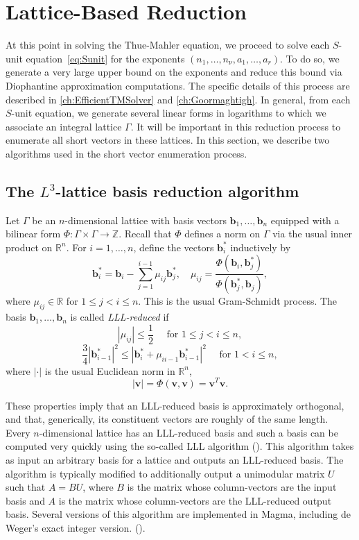 \section{Lattice-Based Reduction}
\label{sec:LatticeReduction}

At this point in solving the Thue-Mahler equation, we proceed to solve each $S$-unit equation~\eqref{eq:Sunit} for the exponents $(n_1, \dots, n_{\nu}, a_1, \dots, a_r)$. To do so, we generate a very large upper bound on the exponents and reduce this bound via Diophantine approximation computations. The specific details of this process are described in \autoref{ch:EfficientTMSolver} and \autoref{ch:Goormaghtigh}. In general, from each $S$-unit equation, we generate several linear forms in logarithms to which we associate an integral lattice $\Gamma$. It will be important in this reduction process to enumerate all short vectors in these lattices. In this section, we describe two algorithms used in the short vector enumeration process. 


\subsection{The $L^3$-lattice basis reduction algorithm}
\label{subsec:LLL}

Let $\Gamma$ be an $n$-dimensional lattice with basis vectors $\mathbf{b}_1, \dots, \mathbf{b}_n$ equipped with a bilinear form $\Phi: \Gamma \times \Gamma \to \mathbb{Z}$. Recall that $\Phi$ defines a norm on $\Gamma$ via the usual inner product on $\mathbb{R}^n$. For $i = 1, \dots, n$, define the vectors $\mathbf{b}_i^*$ inductively by
\[\mathbf{b}_i^* = \mathbf{b}_i - \sum_{j=1}^{i-1}\mu_{ij}\mathbf{b}_j^*, \quad \mu_{ij} = \frac{\Phi(\mathbf{b}_i,\mathbf{b}_j^*)}{\Phi(\mathbf{b}_j^*,\mathbf{b}_j)},\]
where $\mu_{ij} \in \mathbb{R}$ for $1\leq j < i \leq n$. This is the usual Gram-Schmidt process. The basis $\mathbf{b}_1,\dots, \mathbf{b}_n$ is called \textit{LLL-reduced} if
\[|\mu_{ij}| \leq \frac{1}{2} \quad \text{ for } 1\leq j < i \leq n, \]
\[\frac{3}{4}|\mathbf{b}_{i-1}^*|^2 \leq |\mathbf{b}_i^* + \mu_{ii-1}\mathbf{b}_{i-1}^*|^2 \quad \text{ for } 1 <i \leq n,\]
where $| \cdot |$ is the usual Euclidean norm in $\mathbb{R}^n$, 
\[|\mathbf{v}| = \Phi(\mathbf{v},\mathbf{v}) = \mathbf{v}^{T}\mathbf{v}.\]

These properties imply that an LLL-reduced basis is approximately orthogonal, and that, generically, its constituent vectors are roughly of the same length. Every $n$-dimensional lattice has an LLL-reduced basis and such a basis can be computed very quickly using the so-called LLL algorithm (\cite{LLL}). This algorithm takes as input an arbitrary basis for a lattice and outputs an LLL-reduced basis. The algorithm is typically modified to additionally output a unimodular matrix $U$ such that $A = BU$, where $B$ is the matrix whose column-vectors are the input basis and $A$ is the matrix whose column-vectors are the LLL-reduced output basis. Several versions of this algorithm are implemented in Magma, including de Weger's exact integer version. (\cite{Weg0}).

